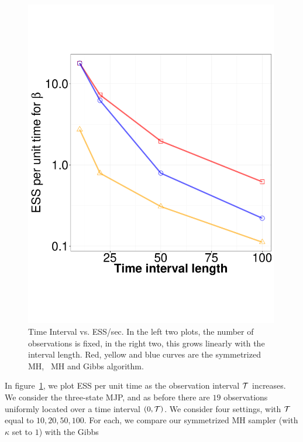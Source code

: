 {\begin{figure}
\begin{minipage}[hp]{0.24\linewidth}
    \includegraphics [width=0.99\textwidth, angle=0]{figs/ESS_vs_t_beta.pdf}
  \end{minipage}
    \caption{Time Interval vs. ESS/sec. In the left two plots, the number of 
    observations is fixed, in the right two, this grows linearly with the
  interval length. Red, yellow and blue curves are the symmetrized MH,
  \naive\ MH and Gibbs algorithm.}
     \label{fig:TSS}
  \end{figure}
In figure~\ref{fig:TSS}, we plot ESS per unit time as the observation 
interval ${\mathcal T}$ increases. We consider the three-state MJP, and as before there 
are $19$ observations uniformly located over a time interval $(0,{\mathcal T})$. We 
consider four settings, with ${\mathcal T}$ equal to $10, 20, 50, 100$. For each, we 
compare our symmetrized MH sampler (with $\kappa$ set to $1$) with the Gibbs 
}
